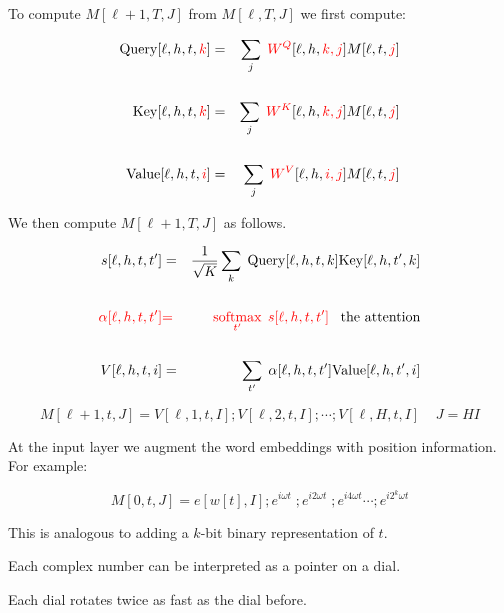 {

To compute {\color{red} $M[\ell+1,T,J]$} from {\color{red} $M[\ell,T,J]$} we first compute:
      
\begin{eqnarray*}
\mathrm{Query}[\ell,h,t,{\color{red} k}] & = & \sum_j\;{\color{red} W^Q}[\ell,h,{\color{red} k,j}]M[\ell,t,{\color{red} j}] \\
\\
\mathrm{Key}[\ell,h,t,{\color{red} k}] & = & \sum_j\;{\color{red} W^K}[\ell,h,{\color{red} k,j}]M[\ell,t,{\color{red} j}] \\
\\
\mathrm{Value}[\ell,h,t,{\color{red} i}] & = & \sum_j\;{\color{red} W^V}[\ell,h,{\color{red} i,j}]M[\ell,t,{\color{red} j}]
\end{eqnarray*}


We then compute {\color{red} $M[\ell+1,T,J]$} as follows.

{\color{red}
\begin{eqnarray*}
s[\ell,h,t,t'] & = &\frac{1}{\sqrt{K}} \sum_k\;\mathrm{Query}[\ell,h,t,k]\mathrm{Key}[\ell,h,t',k] \\
\\
{\color{red} \alpha[\ell,h,t,t']} & {\color{red} =} & {\color{red} \operatorname*{softmax}_{t'} \;s[\ell,h,t,t']}\;\;\;\mbox{the attention} \\
\\
V[\ell,h,t,i] & = & \sum_{t'}\;\alpha[\ell,h,t,t']\mathrm{Value}[\ell,h,t',i]
\end{eqnarray*}
}

{\color{red} $$M[\ell+1,t,J] = V[\ell,1,t,I];V[\ell,2,t,I];\cdots;V[\ell,H,t,I] \;\;\;\; J = HI$$}


At the input layer we augment the word embeddings with position information. For example:

\vfill
{\color{red} $$M[0,t,J] = e[w[t],I];e^{i\omega t}\;;e^{i2\omega t}\;;e^{i4\omega t}\cdots;e^{i2^k\omega t}$$}

\vfill
This is analogous to adding a $k$-bit binary representation of $t$.

\vfill
Each complex number can be interpreted as a pointer on a dial.

\vfill
Each dial rotates twice as fast as the dial before.


}
